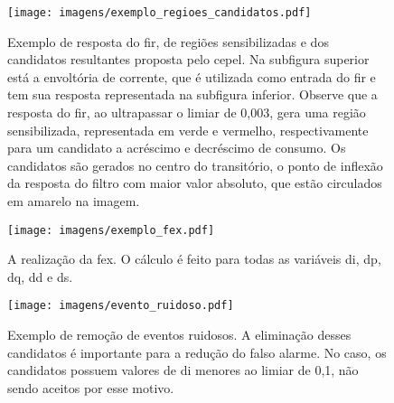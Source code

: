 \begin{figure*}[b!]
  \begin{center}
    \begin{subfigure}[c]{\textwidth}
      \texttt{[image: imagens/exemplo\_regioes\_candidatos.pdf]}
      \caption{Exemplo de resposta do \acs{fir}, de regiões sensibilizadas e dos candidatos
resultantes proposta pelo \acs{cepel}. Na subfigura superior está a
envoltória de corrente, que é utilizada como entrada do \acs{fir} e
tem sua resposta representada na subfigura inferior. Observe que a
resposta do \acs{fir}, ao ultrapassar o limiar de 0,003, gera uma região
sensibilizada, representada em verde e vermelho, respectivamente para
um candidato a acréscimo e decréscimo de consumo. Os candidatos são
gerados no centro do transitório, o ponto de inflexão da resposta do
filtro com maior valor absoluto, que estão circulados em amarelo na
imagem.}
      \label{fig:resp_fir}
    \end{subfigure}
    \hfill
  \end{center}
\end{figure*}
\begin{figure*}[ht!]
  \begin{center}
    \ContinuedFloat
    \begin{subfigure}[c]{\textwidth}
      \texttt{[image: imagens/exemplo\_fex.pdf]}
      \caption{A realização da \acs{fex}. O cálculo é feito para todas as
variáveis \acs{di}, \acs{dp}, \acs{dq}, \acs{dd} e \acs{ds}.}
      \label{fig:cepel_fex}
    \end{subfigure}
    \hfill
    \begin{subfigure}[c]{\textwidth}
      \texttt{[image: imagens/evento\_ruidoso.pdf]}
      \caption{Exemplo de remoção de eventos ruidosos. A eliminação
desses candidatos é importante para a redução do falso alarme. No
caso, os candidatos possuem valores de \acs{di} menores ao limiar de
0,1, não sendo aceitos por esse motivo.}
      \label{fig:ex_ruidoso}
    \end{subfigure}
  \end{center}
\caption[Gráficos descrevendo a operação do método proposta pelo
\acs{cepel}.]{Gráficos descrevendo a operação do método proposta
pelo \acs{cepel}. Os gráficos foram gerados utilizando o ambiente de
análise implementado por este trabalho descrito no
Capítulo~\ref{chap:framework}.}
\label{fig:cepel_metodologia_operacao}
\end{figure*}

